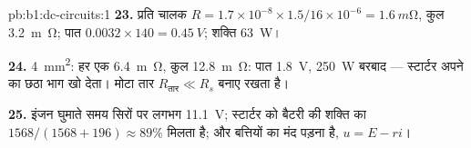 \begin{solution}{pb:b1:dc-circuits:1}
\textbf{23.} प्रति चालक $R = 1.7\times10^{-8} \times 1.5/16\times10^{-6} =
\qty{1.6}{m\ohm}$, कुल \qty{3.2}{m\ohm}; पात $0.0032
\times 140 = \qty{0.45}{V}$; शक्ति \qty{63}{W}।

\textbf{24.} \qty{4}{mm^2}: हर एक \qty{6.4}{m\ohm}, कुल \qty{12.8}{m\ohm}:
पात \qty{1.8}{V}, \qty{250}{W} बरबाद --- स्टार्टर अपने  का
छठा भाग खो देता। मोटा तार $R_{\text{तार}} \ll R_s$ बनाए रखता है।

\textbf{25.} इंजन घुमाते समय सिरों पर लगभग \qty{11.1}{V}; स्टार्टर को बैटरी
की शक्ति का $1568/(1568 + 196) \approx 89\%$ मिलता है; और बत्तियों का मंद
पड़ना  है, $u = E - ri$।
\end{solution}
